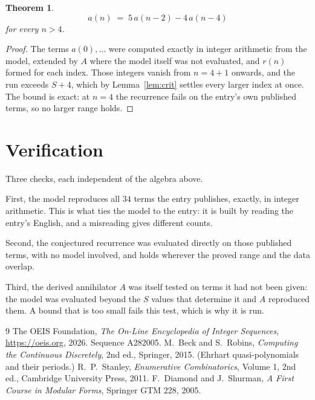 \documentclass[11pt,a4paper]{article}
\theoremstyle{plain}
\newtheorem{theorem}{Theorem}
\theoremstyle{definition}
\begin{document}
\begin{theorem}
\[
a(n)\;=\;5\,a(n-2) - 4\,a(n-4)
\]
for every $n>4$.
\end{theorem}

\begin{proof}
The terms $a(0),\dots$ were computed exactly in integer arithmetic from the model, extended by
$A$ where the model itself was not evaluated, and $r(n)$ formed for each index. Those integers
vanish from $n=4+1$ onwards, and the run exceeds $S+4$, which by
Lemma~\ref{lem:crit} settles every larger index at once. The bound is exact: at $n=4$ the recurrence fails on the entry's own published terms, so no larger range holds.
\end{proof}

\section{Verification}

Three checks, each independent of the algebra above.

First, the model reproduces all $34$ terms the entry publishes, exactly, in integer
arithmetic. This is what ties the model to the entry: it is built by reading the entry's
English, and a misreading gives different counts.

Second, the conjectured recurrence was evaluated directly on those published terms, with no
model involved, and holds wherever the proved range and the data overlap.

Third, the derived annihilator $A$ was itself tested on terms it had not been given: the model
was evaluated beyond the $S$ values that determine it and $A$ reproduced them. A bound that is
too small fails this test, which is why it is run.

\begin{thebibliography}{9}
 The OEIS Foundation, \emph{The On-Line Encyclopedia of Integer
Sequences}, \url{https://oeis.org}, 2026. Sequence A282005.
 M.~Beck and S.~Robins, \emph{Computing the Continuous Discretely},
2nd ed., Springer, 2015. (Ehrhart quasi-polynomials and their periods.)
 R.~P.~Stanley, \emph{Enumerative Combinatorics}, Volume 1, 2nd ed.,
Cambridge University Press, 2011.
 F.~Diamond and J.~Shurman, \emph{A First Course in Modular Forms},
Springer GTM 228, 2005.
\end{thebibliography}
\end{document}
